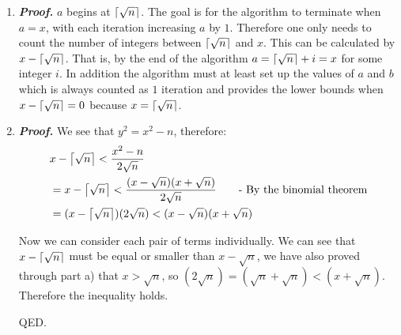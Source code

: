 \documentclass[11pt]{article}
\DeclarePairedDelimiter{\ceil}{\lceil}{\rceil}
\theoremstyle{definition}
\begin{document}
\begin{enumerate}
\begin{enumerate}
(output = $q$): Suppose $a = x$. Then $b = \sqrt{x^2 - n}$, $b^2 = x^2 - n = y^2$, therefore $b = y$. Then $a - b = x - y = q$.

QED

\item  %

\textbf{\emph{Proof.}}
$a$ begins at $\ceil*{\sqrt{n}}$. The goal is for the algorithm to terminate when $a = x$, with each iteration increasing $a$ by $1$. Therefore one only needs to count the number of integers between $\ceil*{\sqrt{n}}$ and $x$. This can be calculated by $x - \ceil*{\sqrt{n}}$. That is, by the end of the algorithm $a = \ceil*{\sqrt{n}} + i = x$ for some integer $i$. In addition the algorithm must at least set up the values of $a$ and $b$ which is always counted as $1$ iteration and provides the lower bounds when $x - \ceil*{\sqrt{n}} = 0$ because $x = \ceil*{\sqrt{n}}$. 

\item  %
\textbf{\emph{Proof.}} We see that $y^2 = x^2 - n$, therefore:
\begin{align*}
&x - \ceil*{\sqrt{n}} < \frac{x^2 - n}{2\sqrt{n}} \\ 
&= x - \ceil*{\sqrt{n}} < \frac{(x - \sqrt{n})(x + \sqrt{n})}{2\sqrt{n}} 	\text{\qquad- By the binomial theorem} \\
&= (x - \ceil*{\sqrt{n}})(2\sqrt{n}) < (x - \sqrt{n})(x + \sqrt{n}) \\
\end{align*} 

Now we can consider each pair of terms individually. We can see that $x - \ceil*{\sqrt{n}}$ must be equal or smaller than $x - \sqrt{n}$, we have also proved through part a) that $x > \sqrt{n}$, so $(2\sqrt{n}) = (\sqrt{n} + \sqrt{n}) < (x + \sqrt{n})$. Therefore the inequality holds. 

QED.


\end{enumerate}
\end{enumerate}
\end{document}
